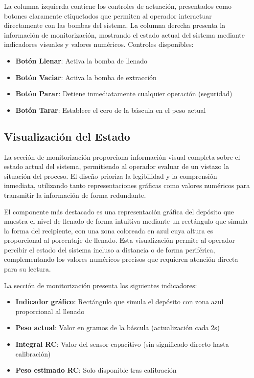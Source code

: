 \documentclass[12pt,a4paper]{article}
\begin{document}
La columna izquierda contiene los controles de actuación, presentados como botones claramente etiquetados que permiten al operador interactuar directamente con las bombas del sistema. 
La columna derecha presenta la información de monitorización, mostrando el estado actual del sistema mediante indicadores visuales y valores numéricos. Controles disponibles:
\begin{itemize}
    \item \textbf{Botón Llenar}: Activa la bomba de llenado
    \item \textbf{Botón Vaciar}: Activa la bomba de extracción
    \item \textbf{Botón Parar}: Detiene inmediatamente cualquier operación (seguridad)
    \item \textbf{Botón Tarar}: Establece el cero de la báscula en el peso actual
\end{itemize}

\subsection{Visualización del Estado}

La sección de monitorización proporciona información visual completa sobre el estado actual del sistema, permitiendo al operador evaluar de un vistazo la situación del proceso. El diseño prioriza la legibilidad y la comprensión inmediata, utilizando tanto representaciones gráficas como valores numéricos para transmitir la información de forma redundante.

El componente más destacado es una representación gráfica del depósito que muestra el nivel de llenado de forma intuitiva mediante un rectángulo que simula la forma del recipiente, con una zona coloreada en azul cuya altura es proporcional al porcentaje de llenado. Esta visualización permite al operador percibir el estado del sistema incluso a distancia o de forma periférica, complementando los valores numéricos precisos que requieren atención directa para su lectura.

La sección de monitorización presenta los siguientes indicadores:

\begin{itemize}
    \item \textbf{Indicador gráfico}: Rectángulo que simula el depósito con zona azul proporcional al llenado
    \item \textbf{Peso actual}: Valor en gramos de la báscula (actualización cada 2s)
    \item \textbf{Integral RC}: Valor del sensor capacitivo (sin significado directo hasta calibración)
    \item \textbf{Peso estimado RC}: Solo disponible tras calibración
\end{itemize}
\end{document}
